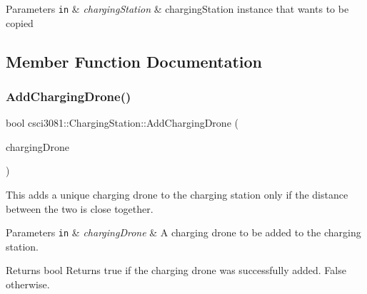 \begin{DoxyParams}[1]{Parameters}
\mbox{\tt in}  & {\em charging\+Station} & charging\+Station instance that wants to be copied \\
\hline
\end{DoxyParams}


\subsection{Member Function Documentation}
\mbox{\label{classcsci3081_1_1ChargingStation_a49703ccf92dd023e4be93b981d24904a}} 
\subsubsection{\texorpdfstring{Add\+Charging\+Drone()}{AddChargingDrone()}}
{\footnotesize\ttfamily bool csci3081\+::\+Charging\+Station\+::\+Add\+Charging\+Drone (\begin{DoxyParamCaption}\item[{\hyperlink{classcsci3081_1_1RechargeDrone}{Recharge\+Drone} $\ast$}]{charging\+Drone }\end{DoxyParamCaption})}



This adds a unique charging drone to the charging station only if the distance between the two is close together. 


\begin{DoxyParams}[1]{Parameters}
\mbox{\tt in}  & {\em charging\+Drone} & A charging drone to be added to the charging station. \\
\hline
\end{DoxyParams}
\begin{DoxyReturn}{Returns}
bool Returns true if the charging drone was successfully added. False otherwise. 
\end{DoxyReturn}
\mbox{\label{classcsci3081_1_1ChargingStation_a903c7a2bf4e869ddae25409a567a16f2}} 
